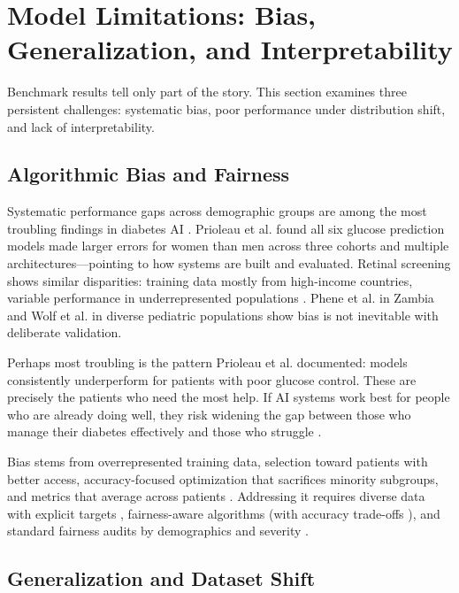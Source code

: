 \section{Model Limitations: Bias, Generalization, and Interpretability}

Benchmark results tell only part of the story. This section examines three persistent challenges: systematic bias, poor performance under distribution shift, and lack of interpretability.

\subsection{Algorithmic Bias and Fairness}

Systematic performance gaps across demographic groups are among the most troubling findings in diabetes AI \cite{wang2024ai, prioleau2025deep}. Prioleau et al. \cite{prioleau2025deep} found all six glucose prediction models made larger errors for women than men across three cohorts and multiple architectures—pointing to how systems are built and evaluated. Retinal screening shows similar disparities: training data mostly from high-income countries, variable performance in underrepresented populations \cite{wang2024ai, olusanya2024mitigating, zhang2025systematic}. Phene et al. \cite{phene2019artificial} in Zambia and Wolf et al. \cite{wolf2024access} in diverse pediatric populations show bias is not inevitable with deliberate validation.

Perhaps most troubling is the pattern Prioleau et al. \cite{prioleau2025deep} documented: models consistently underperform for patients with poor glucose control. These are precisely the patients who need the most help. If AI systems work best for people who are already doing well, they risk widening the gap between those who manage their diabetes effectively and those who struggle \cite{haider2024algorithmic, liu2025scoping}.

Bias stems from overrepresented training data, selection toward patients with better access, accuracy-focused optimization that sacrifices minority subgroups, and metrics that average across patients \cite{wang2024ai, fahmy2025exploring, oikonomou2023machine}. Addressing it requires diverse data with explicit targets \cite{fahmy2025exploring, bai2024federated}, fairness-aware algorithms (with accuracy trade-offs \cite{fahmy2025exploring}), and standard fairness audits by demographics and severity \cite{wang2024ai, liu2025scoping}.

\subsection{Generalization and Dataset Shift}

